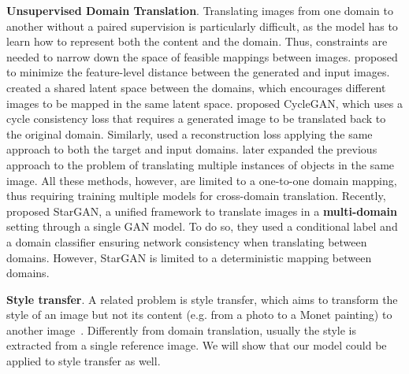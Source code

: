 \documentclass[runningheads]{llncs}
\begin{document}
\noindent \textbf{Unsupervised Domain Translation}. Translating images from one domain to another without a paired supervision is particularly difficult, as the model has to learn how to represent both the content and the domain. Thus, constraints are needed to narrow down the space of feasible mappings between images.
\cite{taigmanPW17} proposed to minimize the feature-level distance between the generated and input images. \cite{liu2017unsupervised} created a shared latent space between the domains, which encourages different images to be mapped in the same latent space. \cite{zhu2017unpaired} proposed CycleGAN, which uses a cycle consistency loss that requires a generated image to be translated back to the original domain. Similarly, \cite{kim2017learning} used a reconstruction loss applying the same approach to both the target and input domains. \cite{mo2018instanceaware} later expanded the previous approach to the problem of translating multiple instances of objects in the same image. All these methods, however, are limited to a one-to-one domain mapping, thus requiring training multiple models for cross-domain translation. 
Recently, \cite{choi2018stargan} proposed StarGAN, a unified framework to translate images in a \textbf{multi-domain} setting through a single GAN model. To do so, they used a conditional label and a domain classifier ensuring network consistency when translating between domains. However, StarGAN is limited to a deterministic mapping between domains. 

\noindent \textbf{Style transfer}. A related problem is style transfer, which aims to transform the style of an image but not its content (e.g. from a photo to a Monet painting) to another image~\cite{donahue2018semantically,gatys2015neural,huang2017arbitrary,tenenbaum1997separating}. Differently from domain translation, usually the style is extracted from a single reference image. We will show that our model could be applied to style transfer as well.
\end{document}
